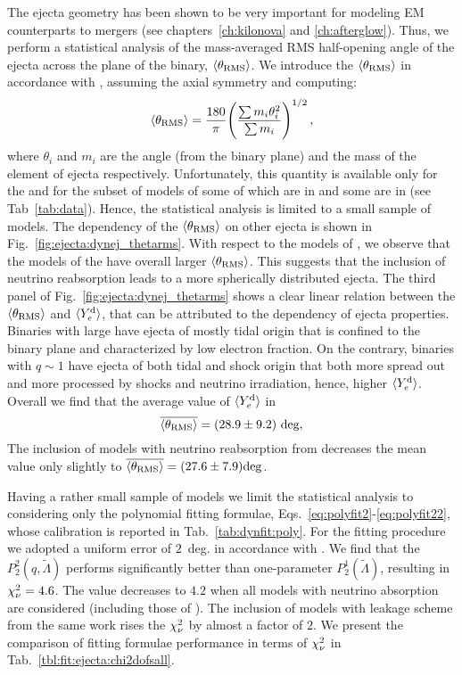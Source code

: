 The ejecta geometry has been shown to be very important for modeling \ac{EM} 
counterparts to mergers (see chapters~\ref{ch:kilonova} and \ref{ch:afterglow}). %
Thus, we perform a statistical analysis of the mass-averaged \ac{RMS} half-opening 
angle of the ejecta across the plane of the binary, $\langle\theta_{\rm RMS}\rangle$.
We introduce the $\langle\theta_{\rm RMS}\rangle$ in accordance with \citet{Radice:2018pdn}, assuming 
the axial symmetry and computing:
%
\begin{equation}
\langle\theta_{\rm RMS}\rangle = \frac{180}{\pi}\Bigg(\frac{\sum m_i \theta_i^2}{\sum m_i}\Bigg)^{1/2}\, ,
\end{equation}
%
where $\theta_i$ and $m_i$ are the angle (from the binary plane) and the mass of 
the element of ejecta respectively.
%
Unfortunately, this quantity is available only for the \DSrefset{} and for the subset 
of models of \citet{Radice:2018pdn} some of which are in \DScool{} and some are in 
\DSheatcool{} (see Tab~\ref{tab:data}). Hence, the statistical analysis is limited 
to a small sample of models. The dependency of the $\langle\theta_{\rm RMS}\rangle$ on other ejecta is shown in Fig.~\ref{fig:ejecta:dynej_thetarms}.
%
With respect to the models of \citet{Radice:2018pdn}, we observe that the models of the 
\DSrefset{} have overall larger $\langle\theta_{\rm RMS}\rangle$. This suggests that the inclusion of 
neutrino reabsorption leads to a more spherically distributed ejecta.
%
The third panel of Fig.~\ref{fig:ejecta:dynej_thetarms} shows a clear linear relation 
between the $\langle\theta_{\rm RMS}\rangle$ and $\langle Y^{\text{d}}_{e}\rangle$, that can be attributed to the \mr{} dependency of 
ejecta properties. Binaries with large \mr{} have ejecta of mostly tidal origin that 
is confined to the binary plane and characterized by low electron fraction. On the 
contrary, binaries with $q\sim 1$ have ejecta of both tidal and shock origin that both 
more spread out and more processed by shocks and neutrino irradiation, hence, higher $\langle Y^{\text{d}}_{e}\rangle$.
%
Overall we find that the average value of $\langle Y^{\text{d}}_{e}\rangle$ in \DSrefset{}
%
\begin{equation}
\overline{\langle\theta_{\rm RMS}\rangle} = (28.9 \pm 9.2)~\text{deg},
\end{equation}
%
The inclusion of models with neutrino reabsorption from \citet{Radice:2018pdn} decreases 
the mean value only slightly to $\overline{\langle\theta_{\rm RMS}\rangle}=(27.6 \pm 7.9) \text{deg}$.


%
Having a rather small sample of models we limit the statistical analysis to considering 
only the polynomial fitting formulae, Eqs.~\eqref{eq:polyfit2}-\eqref{eq:polyfit22}, whose 
calibration is reported in Tab.~\ref{tab:dynfit:poly}. 
%
For the fitting procedure we adopted a uniform error of $2$~deg. in accordance with
\citet{Radice:2018pdn}.
%
We find that the $P_2^2(q,\tilde\Lambda)$ performs significantly better than one-parameter 
$P_2^1(\tilde\Lambda)$, resulting in $\chi_{\nu}^2=4.6$. The value decreases to $4.2$ when 
all models with neutrino absorption are considered (including those of \citet{Radice:2018pdn}).
The inclusion of models with leakage scheme from the same work rises the $\chi_{\nu}^2$ by almost 
a factor of $2$. 
We present the comparison of fitting formulae performance in terms of $\chi_{\nu}^2$ in 
Tab.~\ref{tbl:fit:ejecta:chi2dofsall}.

